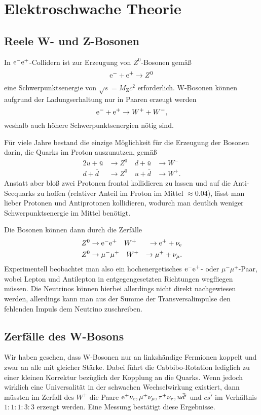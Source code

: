 \chapter{Elektroschwache Theorie}

\section{Reele W- und Z-Bosonen}
In $\text{e}^-\text{e}^+$-Collidern ist zur Erzeugung von $Z^0$-Bosonen gemäß
\begin{equation*}
	\text{e}^- + \text{e}^+ \rightarrow Z^0
\end{equation*}
eine Schwerpunktsenergie von $\sqrt{s}=M_\text{Z}c^2$ erforderlich.
W-Bosonen können aufgrund der Ladungserhaltung nur in Paaren erzeugt werden
\begin{equation*}
	\text{e}^- + \text{e}^+ \rightarrow W^+ + W^-,
\end{equation*}
weshalb auch höhere Schwerpunktsenergien nötig sind.

Für viele Jahre bestand die einzige Möglichkeit für die Erzeugung der Bosonen darin,
die Quarks im Proton auszunutzen, gemäß
\begin{alignat*}{2}
	u + \bar{u} &\rightarrow Z^0 \quad d + \bar{u} &\rightarrow W^- \\
	d + \bar{d} &\rightarrow Z^0 \quad u + \bar{d} &\rightarrow W^+.
\end{alignat*}
Anstatt aber bloß zwei Protonen frontal kollidieren zu lassen und auf die Anti-Seequarks zu hoffen (relativer Anteil im Proton im Mittel $\approx 0.04$),
lässt man lieber Protonen und Antiprotonen kollidieren, wodurch man deutlich weniger Schwerpunktsenergie im Mittel benötigt.

Die Bosonen können dann durch die Zerfälle
\begin{alignat*}{2}
	Z^0 &\rightarrow \text{e}^-\text{e}^+ \quad W^+ &\rightarrow \text{e}^+ + \nu_\text{e} \\
	Z^0 &\rightarrow \mu^- \mu^+ \quad W^+ &\rightarrow \mu^+ + \nu_\mu .
\end{alignat*}
Experimentell beobachtet man also ein hochenergetisches $\text{e}^-\text{e}^+$- oder $\mu^-\mu^+$-Paar, wobei Lepton und Antilepton in entgegengesetzten Richtungen wegfliegen müssen.
Die Neutrinos können hierbei allerdings nicht direkt nachgewiesen werden, allerdings kann man aus der Summe der Transversalimpulse den fehlenden Impuls dem Neutrino zuschreiben.

\section{Zerfälle des W-Bosons}
Wir haben gesehen, dass W-Bosonen nur an linkshändige Fermionen koppelt und zwar an alle mit gleicher Stärke.
Dabei führt die Cabbibo-Rotation lediglich zu einer kleinen Korrektur bezüglich der Kopplung an die Quarks.
Wenn jedoch wirklich eine Universalität in der schwachen Wechselwirkung existiert,
dann müssten im Zerfall des $W^+$ die Paare $\text{e}^+\nu_e, \mu^+\nu_\mu, \tau^+\nu_\tau, u\bar{d'}$ und $c\bar{s'}$ im Verhältnis $1:1:1:3:3$ erzeugt werden.
Eine Messung bestätigt diese Ergebnisse.

